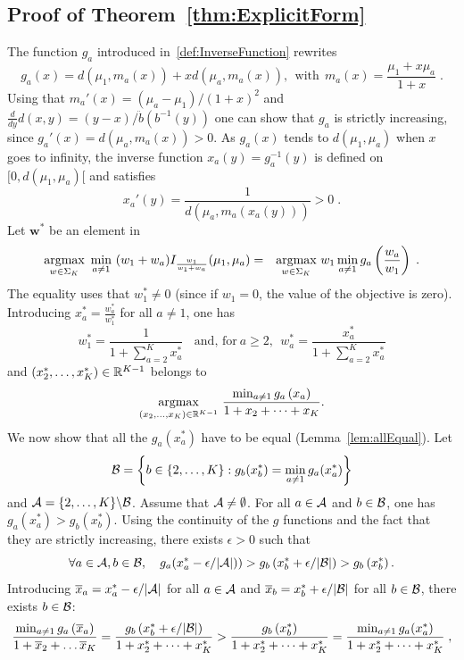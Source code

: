 \documentclass{colt2016} %
\begin{document}
\subsection{Proof of Theorem~\ref{thm:ExplicitForm}}\label{subsec:proofExplicit}
The function $g_a$ introduced in~\eqref{def:InverseFunction} rewrites
\[g_a(x)  =  d\left(\mu_1, m_a(x)\right) + x d(\mu_a,m_a(x)), \ \ \text{with} \ \ m_a(x) = \frac{\mu_1 + x \mu_a}{1+x}\;.\]
Using that $m_a'(x) = (\mu_a - \mu_1)/(1+x)^2$ and $\frac{d}{dy}d(x,y) = (y-x)/\ddot{b}(b^{-1}(y))$ one can show that $g_a$ is strictly increasing, since $g_a'(x) = d(\mu_a,m_a(x))>0$.
As $g_a(x)$ tends to $d(\mu_1,\mu_a)$ when $x$ goes to infinity, the inverse function $x_a(y) = g_a^{-1}(y)$ is defined on $[0,d(\mu_1,\mu_a)[$ and satisfies 
\[x_a'(y) = \frac{1}{d(\mu_a,m_a(x_a(y)))}>0\;.\]
Let $\bm w^*$ be an element in 
\begin{eqnarray*}
 \underset{w \in \Sigma_K}{\text{argmax}} \ \min_{a \neq 1} \ (w_1 + w_a)I_{\frac{w_1}{w_1+w_a}}(\mu_{1},\mu_a) 
 & = &\underset{w \in \Sigma_K}{\text{argmax}} \ w_1 \min_{a \neq 1} g_a\left(\frac{w_a}{w_1}\right)\;.
\end{eqnarray*}
The equality uses that $w_1^*\neq 0$ (since if $w_1=0$, the value of the objective is zero). Introducing $x_a^* = \frac{w_a^*}{w_1^*}$ for all $a\neq 1$, one has 
\[w_1^* = \frac{1}{1 + \sum_{a=2}^K x_a^*} \ \ \ \ \text{and,  for} \ a\geq 2, \ \ w_a^* =  \frac{x_a^*}{1 + \sum_{a=2}^K x_a^*}\]
and $(x_2^*,\dots,x_K^*) \in \mathbb{R}^{K-1}$ belongs to 
\begin{eqnarray}
\underset{(x_2,\dots,x_K) \in \mathbb{R}^{K-1}}{\text{argmax}} \ \frac{\min_{a \neq 1} g_a\left(x_a\right)}{1 + x_2 + \dots + x_{K}}. \label{equ:Argmax}
\end{eqnarray}
We now show that all the $g_a(x_a^*)$ have to be equal (Lemma~\ref{lem:allEqual}). Let \[\mathcal{B} = \left\{ b \in \{2,\dots,K\} : g_b(x_b^*) = \min_{a \neq 1} g_a(x_a^*)\right\}\] and $\mathcal{A} = \{2,\dots,K\} \backslash \mathcal{B}$. Assume that $\mathcal{A} \neq \emptyset$. For all $a\in \mathcal{A}$ and $b\in \mathcal{B}$, one has $g_a(x_a^*) > g_b(x_b^*)$. Using the continuity of the $g$ functions and the fact that they are strictly increasing, there exists $\epsilon>0$ such that 
\[\forall a \in \cA, b \in \cB, \ \ \  g_a(x_a^*-{\epsilon}/|\cA|)) > g_b\left(x_b^* + {\epsilon}/{|\cB|}\right)>g_b\left(x_b^*\right).\]
Introducing $\overline{x}_a = x_a^*-\epsilon/|\mathcal{A}|$ for all $a\in\mathcal{A}$ and $\overline{x}_b =x_b^* + {\epsilon}/{|\mathcal{B}|}$ for all $b \in \mathcal{B}$, there exists $b\in \mathcal{B}$: 
\[\frac{\min_{a \neq 1} g_a\left(\overline{x}_a\right)}{1 + \overline{x}_2 + \dots \overline{x}_K}  = \frac{g_b\left(x_b^* + {\epsilon}/{|\mathcal{B}|}\right)}{1 + x_2^* + \dots + x^*_{K}}  >  \frac{g_b\left(x_b^*\right)}{1 + x_2^* + \dots + x^*_{K}} =\frac{\min_{a\neq 1} g_a(x_a^*)}{1 + x_2^* + \dots + x^*_{K}}\;,\]
\end{document}
